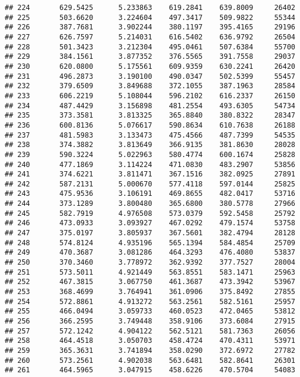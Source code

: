 \documentclass[]{article}
\begin{document}
\begin{verbatim}
## 224       629.5425      5.233863    619.2841    639.8009     26402
## 225       503.6620      3.224604    497.3417    509.9822     55344
## 226       387.7681      3.902244    380.1197    395.4165     29196
## 227       626.7597      5.214031    616.5402    636.9792     26504
## 228       501.3423      3.212304    495.0461    507.6384     55700
## 229       384.1561      3.877352    376.5565    391.7558     29037
## 230       620.0800      5.175561    609.9359    630.2241     26420
## 231       496.2873      3.190100    490.0347    502.5399     55457
## 232       379.6509      3.849688    372.1055    387.1963     28584
## 233       606.2219      5.108044    596.2102    616.2337     26150
## 234       487.4429      3.156898    481.2554    493.6305     54734
## 235       373.3581      3.813325    365.8840    380.8322     28347
## 236       600.8136      5.076617    590.8634    610.7638     26188
## 237       481.5983      3.133473    475.4566    487.7399     54535
## 238       374.3882      3.813649    366.9135    381.8630     28028
## 239       590.3224      5.022963    580.4774    600.1674     25828
## 240       477.1869      3.114224    471.0830    483.2907     53856
## 241       374.6221      3.811471    367.1516    382.0925     27891
## 242       587.2131      5.000670    577.4118    597.0144     25825
## 243       475.9536      3.106191    469.8655    482.0417     53716
## 244       373.1289      3.800480    365.6800    380.5778     27966
## 245       582.7919      4.976508    573.0379    592.5458     25792
## 246       473.0933      3.093927    467.0292    479.1574     53758
## 247       375.0197      3.805937    367.5601    382.4794     28128
## 248       574.8124      4.935196    565.1394    584.4854     25709
## 249       470.3687      3.081286    464.3293    476.4080     53837
## 250       370.3460      3.778972    362.9392    377.7527     28004
## 251       573.5011      4.921449    563.8551    583.1471     25963
## 252       467.3815      3.067750    461.3687    473.3942     53967
## 253       368.4699      3.764941    361.0906    375.8492     27855
## 254       572.8861      4.913272    563.2561    582.5161     25957
## 255       466.0494      3.059733    460.0523    472.0465     53812
## 256       366.2595      3.749448    358.9106    373.6084     27915
## 257       572.1242      4.904122    562.5121    581.7363     26056
## 258       464.4518      3.050703    458.4724    470.4311     53971
## 259       365.3631      3.741894    358.0290    372.6972     27782
## 260       573.2561      4.902038    563.6481    582.8641     26301
## 261       464.5965      3.047915    458.6226    470.5704     54083

\end{verbatim}
\end{document}
